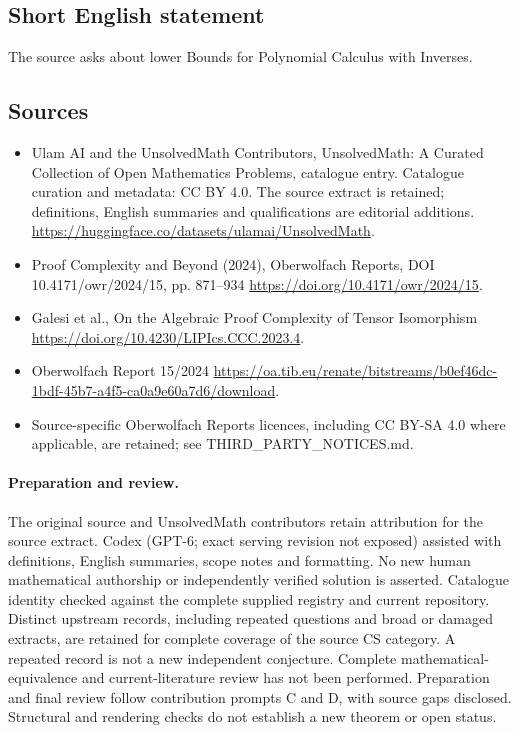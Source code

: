 \documentclass[11pt]{article}
\begin{document}
\subsection{Short English statement}
The source asks about lower Bounds for Polynomial Calculus with Inverses.
\subsection{Sources}
\begin{itemize}
\item[\hypertarget{source:statement:1}{S1}] Ulam AI and the UnsolvedMath Contributors, UnsolvedMath: A Curated Collection of Open Mathematics Problems, catalogue entry. Catalogue curation and metadata: CC BY 4.0. The source extract is retained; definitions, English summaries and qualifications are editorial additions.
\url{https://huggingface.co/datasets/ulamai/UnsolvedMath}.
\item[\hypertarget{source:statement:2}{S2}] Proof Complexity and Beyond (2024), Oberwolfach Reports, DOI 10.4171/owr/2024/15, pp. 871--934
\url{https://doi.org/10.4171/owr/2024/15}.
\item[\hypertarget{source:statement:3}{S3}] Galesi et al., On the Algebraic Proof Complexity of Tensor Isomorphism
\url{https://doi.org/10.4230/LIPIcs.CCC.2023.4}.
\item[\hypertarget{source:statement:4}{S4}] Oberwolfach Report 15/2024
\url{https://oa.tib.eu/renate/bitstreams/b0ef46dc-1bdf-45b7-a4f5-ca0a9e60a7d6/download}.
\item Source-specific Oberwolfach Reports licences, including CC BY-SA 4.0 where applicable, are retained; see THIRD\_PARTY\_NOTICES.md.
\end{itemize}
\paragraph{Preparation and review.}
The original source and UnsolvedMath contributors retain attribution for the source extract. Codex (GPT-6; exact serving revision not exposed) assisted with definitions, English summaries, scope notes and formatting. No new human mathematical authorship or independently verified solution is asserted. Catalogue identity checked against the complete supplied registry and current repository. Distinct upstream records, including repeated questions and broad or damaged extracts, are retained for complete coverage of the source CS category. A repeated record is not a new independent conjecture. Complete mathematical-equivalence and current-literature review has not been performed. Preparation and final review follow contribution prompts C and D, with source gaps disclosed. Structural and rendering checks do not establish a new theorem or open status.
\label{end:statement}
\end{document}
